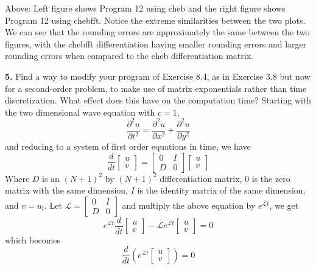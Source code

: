 \documentclass{article}
\begin{document}
Above: Left figure shows Program 12 using cheb and the right figure shows Program 12 using chebfft. Notice the extreme similarities between the two plots. We can see that the rounding errors are approximately the same between the two figures, with the chebfft differentiation having smaller rounding errors and larger rounding errors when compared to the cheb differentiation matrix.
\newline\newline

\textbf{5.} Find a way to modify your program of Exercise 8.4, as in Exercise 3.8 but now for a second-order problem, to make use of matrix exponentials rather than time discretization. What effect does this have on the computation time?
\newline\newline
Starting with the two dimensional wave equation with $c = 1$,
\[\frac{\partial^2u}{\partial t^2} = \frac{\partial^2u}{\partial x^2} + \frac{\partial^2u}{\partial y^2}\]
and reducing to a system of first order equations in time, we have
\[\frac{d}{dt}\begin{bmatrix}
    u\\
    v
\end{bmatrix} = \begin{bmatrix}
    0 & I\\
    D & 0
\end{bmatrix}\begin{bmatrix}
    u\\
    v
\end{bmatrix}\]
Where $D$ is an $(N+1)^2$ by $(N+1)^2$ differentiation matrix, $0$ is the zero matrix with the same dimension, $I$ is the identity matrix of the same dimension, and $v = u_t$.
\newline
Let $\mathcal{L} = \begin{bmatrix}
    0 & I\\
    D & 0
\end{bmatrix}$ and multiply the above equation by $e^{\mathcal{L}t}$, we get
\[e^{\mathcal{L}t}\frac{d}{dt}\begin{bmatrix}
    u\\
    v
\end{bmatrix} - \mathcal{L}e^{\mathcal{L}t}\begin{bmatrix}
    u\\
    v
\end{bmatrix} = 0\]
which becomes
\[\frac{d}{dt}\left(e^{\mathcal{L}t}\begin{bmatrix}
    u\\
    v
\end{bmatrix}\right) = 0\]
\end{document}
